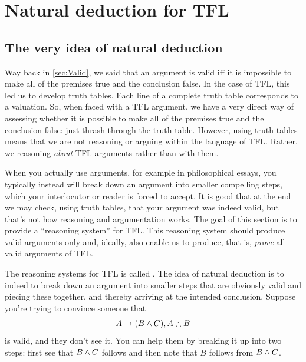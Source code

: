 \part{Natural deduction for TFL}
\label{ch:NDTFL}

\chapter{The very idea of natural deduction}\label{sec:NDVeryIdea}

Way back in \cref{sec:Valid}, we said that an argument is valid iff it is impossible to make all of the premises true and the conclusion false. In the case of TFL, this led us to develop truth tables. Each line of a complete truth table corresponds to a valuation. So, when faced with a TFL argument, we have a very direct way of assessing whether it is possible to make all of the premises true and the conclusion false: just thrash through the truth table. However, using truth tables means that we are not reasoning or arguing within the language of TFL. Rather, we reasoning \emph{about} TFL-arguments rather than with them.

When you actually use arguments, for example in philosophical essays, you typically instead will break down an argument into smaller compelling steps, which your interlocutor or reader is forced to accept. It is good that at the end we may check, using truth tables, that your argument was indeed valid, but that's not how reasoning and argumentation works. The goal of this section is to provide a ``reasoning system'' for TFL. This reasoning system should produce valid arguments only and, ideally, also enable us to produce, that is, \emph{prove} all valid arguments of TFL.

 The reasoning systems for TFL is called . The idea of natural deduction is to indeed to break down an argument into smaller steps that are obviously valid and piecing these together, and thereby arriving at the intended conclusion. Suppose you're trying to convince someone that $$A\eif(B\eand C),A\therefore B$$ is valid, and they don't see it. You can help them by breaking it up into two steps: first see that $B\mathbin{\wedge} C$ follows and then note that $B$ follows from $B\mathbin{\wedge} C$.


